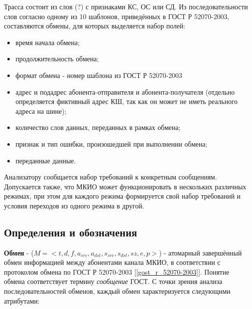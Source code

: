 Трасса состоит из слов (?) с признаками КС, ОС или СД. Из последовательности 
слов согласно одному из 10 шаблонов, приведённых в ГОСТ Р 52070-2003, 
составляются обмены, для которых выделяется набор полей:

\begin{itemize}
 \item время начала обмена;
 \item продолжительность обмена;
 \item формат обмена - номер шаблона из ГОСТ Р 52070-2003
 \item адрес и подадрес абонента-отправителя и абонента-получателя (отдельно 
определяется фиктивный адрес КШ, так как он может не иметь реального адреса на 
шине);
 \item количество слов данных, переданных в рамках обмена;
 \item признак и тип ошибки, произошедшей при выполнении обмена;
 \item переданные данные.
\end{itemize}

Анализатору сообщается набор требований к конкретным сообщениям. 
Допускается также, что МКИО может функционировать в нескольких различных 
режимах, при этом для каждого режима формируется свой набор требований и 
условия переходов из одного режима в другой.

\subsection{Определения и обозначения}


\textbf{Обмен} - ($M = <t, d, f, a_{src}, a_{dst}, s_{src}, s_{dst}, sz, e, p 
>$) - атомарный завершённый обмен информацией между абонентами канала МКИО, в 
соответствии с протоколом обмена по ГОСТ Р 52070-2003 
[\ref{gost_r_52070-2003}]. Понятие обмена соответствует термину 
\textit{сообщение} ГОСТ. С точки зрения анализа последовательностей обменов, 
каждый обмен характеризуется следующими атрибутами:

